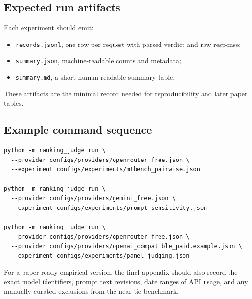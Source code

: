 \documentclass{article}
\begin{document}
\begin{bibunit}[unsrtnat]
\subsection{Expected run artifacts}

Each experiment should emit:
\begin{itemize}[leftmargin=1.5em]
  \item \texttt{records.jsonl}, one row per request with parsed verdict and raw response;
  \item \texttt{summary.json}, machine-readable counts and metadata;
  \item \texttt{summary.md}, a short human-readable summary table.
\end{itemize}
These artifacts are the minimal record needed for reproducibility and later paper tables.

\subsection{Example command sequence}

\begin{verbatim}
python -m ranking_judge run \
  --provider configs/providers/openrouter_free.json \
  --experiment configs/experiments/mtbench_pairwise.json

python -m ranking_judge run \
  --provider configs/providers/gemini_free.json \
  --experiment configs/experiments/prompt_sensitivity.json

python -m ranking_judge run \
  --provider configs/providers/openrouter_free.json \
  --provider configs/providers/openai_compatible_paid.example.json \
  --experiment configs/experiments/panel_judging.json
\end{verbatim}

For a paper-ready empirical version, the final appendix should also record the exact model identifiers, prompt text revisions, date ranges of API usage, and any manually curated exclusions from the near-tie benchmark.

\clearpage
\putbib[references]
\end{bibunit}
\end{document}
